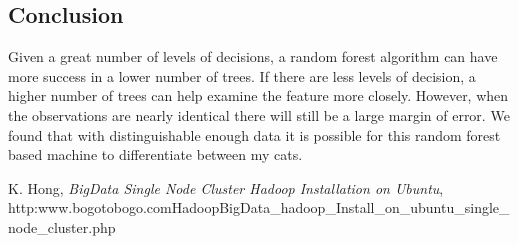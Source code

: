 \documentclass[12pt, letterpaper]{article}
\begin{document}
\subsection{Conclusion}
Given a great number of levels of decisions, a random forest algorithm can have more success in a lower number of trees. If there are less levels of decision, a higher number of trees can help examine the feature more closely. However, when the observations are nearly identical there will still be a large margin of error. We found that with distinguishable enough data it is possible for this random forest based machine to differentiate between my cats.

\begin{thebibliography}{1}
K. Hong, \emph{BigData Single Node Cluster Hadoop Installation on Ubuntu}, http:\/\/www.bogotobogo.com\/Hadoop\/BigData\_hadoop\_Install\_on\_ubuntu\_single\_node\_cluster.php
\end{thebibliography}
\end{document}
